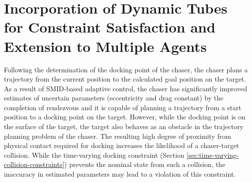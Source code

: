 \chapter{Incorporation of Dynamic Tubes for Constraint Satisfaction and Extension to Multiple Agents}
\label{sec:dynamic-tube}
Following the determination of the docking point of the chaser, the chaser plans a trajectory from the current position to the calculated goal position on the target.
As a result of SMID-based adaptive control, the chaser has significantly improved estimates of uncertain parameters (eccentricity and drag constant) by the completion of rendezvous and it is capable of planning a trajectory from a start position to a docking point on the target.
However, while the docking point is on the surface of the target, the target also behaves as an obstacle in the trajectory planning problem of the chaser.
The resulting high degree of proximity from physical contact required for docking increases the likelihood of a chaser-target collision.
While the time-varying docking constraint (Section \ref{sec:time-varying-collision-constraints}) prevents the nominal state from such a collision, the inaccuracy in estimated parameters may lead to a violation of this constraint.

